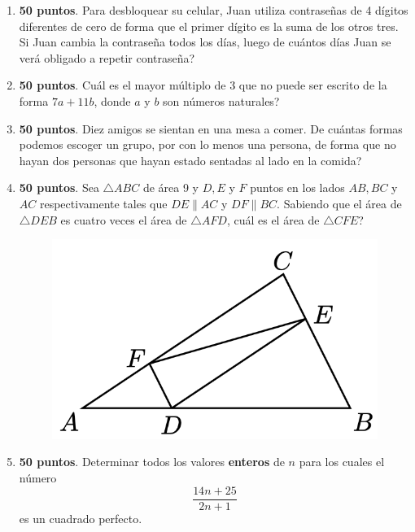 \begin{enumerate}
	\item \textbf{50 puntos}. Para desbloquear su celular, Juan utiliza contraseñas de 4 dígitos diferentes de cero de forma que el primer dígito es la suma de los otros tres. Si Juan cambia la contraseña todos los días, luego de cuántos días Juan se verá obligado a repetir contraseña?
	
	\item \textbf{50 puntos}. Cuál es el mayor múltiplo de 3 que no puede ser escrito de la forma $7a+11b$, donde $a$ y $b$ son números naturales?
	
	\item \textbf{50 puntos}. Diez amigos se sientan en una mesa a comer. De cuántas formas podemos escoger un grupo, por con lo menos una persona, de forma que no hayan dos personas que hayan estado sentadas al lado en la comida?
	
	\item \textbf{50 puntos}. Sea $\triangle ABC$ de área 9 y $D,E$ y $F$ puntos en los lados $AB, BC$ y $AC$ respectivamente tales que $DE\parallel AC$ y $DF\parallel BC$. Sabiendo que el área de $\triangle DEB$ es cuatro veces el área de $\triangle AFD$, cuál es el área de $\triangle CFE$?	
			\begin{figure}[H]
				\centering
				\includegraphics[width=0.45\linewidth]{2020_06_13/imgs/AV_P4}
				\label{avp4}
			\end{figure}
		
	\item \textbf{50 puntos}. Determinar todos los valores \textbf{enteros} de $n$ para los cuales el número
	\[\frac{14n+25}{2n+1}\]
	es un cuadrado perfecto.
	
\end{enumerate}